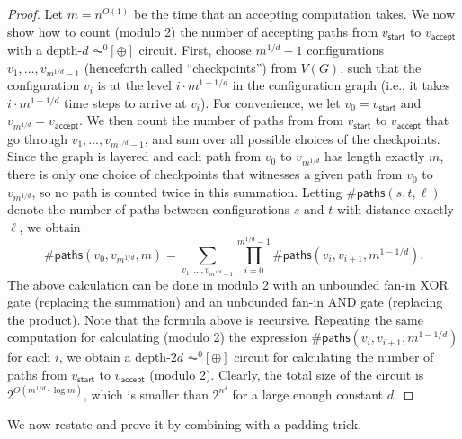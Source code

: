 \documentclass[11pt]{article}
\begin{document}
\begin{proof}
    Let $m = n^{O(1)}$ be the time that an accepting computation takes.
    We now show
    how to count (modulo 2)
    the number of accepting paths from
    $v_{\mathsf{start}}$
    to
    $v_{\mathsf{accept}}$ with a depth-$d$ $\AC^0[\oplus]$ circuit.
    First, choose
    $m^{1/d}-1$ configurations $v_1,\dots,v_{m^{1/d}-1}$
    (henceforth called ``checkpoints'')
    from $V(G)$, such that the configuration
    $v_i$ is at the level
    $i \cdot m^{1-1/d}$ in the configuration graph
    (i.e., it takes $i \cdot m^{1-1/d}$ time steps to arrive at $v_i$).
    For convenience, we let $v_0 = v_{\mathsf{start}}$
    and $v_{m^{1/d}} = v_{\mathsf{accept}}$.
    We then count the number of paths from 
    from $v_{\mathsf{start}}$
    to $v_{\mathsf{accept}}$
    that go through $v_1,\dots,v_{m^{1/d}-1}$,
    and sum over all possible choices of the checkpoints.
    Since the graph is layered and
    each path from $v_0$ to $v_{m^{1/d}}$ has length exactly $m$,
    there is only one choice of checkpoints that witnesses
    a given path from $v_0$ to $v_{m^{1/d}}$,
    so no path is counted twice in this summation.
    Letting
    $\#\mathsf{paths}(s,t,\ell)$ denote the number of paths between
    configurations $s$ and $t$ with distance exactly $\ell$,
    we obtain
    \begin{equation*}
        \#\mathsf{paths}(v_{0},v_{m^{1/d}}, m)
        =
        \sum_{v_1,\dots,v_{m^{1/d}-1}}
        \prod_{i=0}^{m^{1/d}-1}
        \#\mathsf{paths}(v_i,v_{i+1}, m^{1-1/d}).
    \end{equation*}
    The above calculation can be done in modulo 2 with an unbounded fan-in XOR gate
    (replacing the summation)
    and an unbounded fan-in AND gate
    (replacing the product).
    Note that the formula above is recursive.
    Repeating the same computation for calculating (modulo 2)
    the expression
    $\#\mathsf{paths}(v_i,v_{i+1}, m^{1-1/d})$ for each $i$,
    we obtain a depth-$2d$ $\AC^0[\oplus]$ circuit
    for calculating the number of paths from $v_{\mathsf{start}}$ to
    $v_{\mathsf{accept}}$ (modulo 2).
    Clearly, the total size of the circuit is
    $2^{O(m^{1/d} \cdot \log m)}$,
    which is smaller than $2^{n^\delta}$ for a large enough constant $d$.
\end{proof}

We now restate  and prove it
by combining
with a padding trick.
\end{document}

